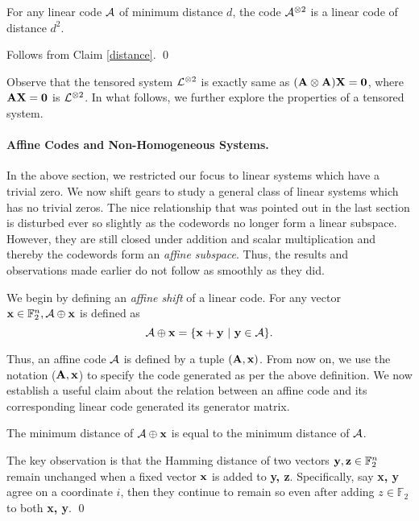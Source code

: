 {\begin{corollary}
  For any linear code ${\cal A}$ of minimum distance $d$, the code
  ${\cal A}^{\otimes 2}$ is a linear code of distance $d^2$.
\end{corollary}
 Follows from Claim \ref{distance}. \qed

Observe that the tensored system ${\cal L}^{\otimes 2}$ is exactly same as
$({\bf A} \otimes {\bf A}) {\bf X} = {\bf 0}$, where ${\bf AX = 0}$ is
${\cal L}^{\otimes 2}$.  In what follows, we further explore the properties
of a tensored system.

\paragraph{Affine Codes and Non-Homogeneous Systems.}

In the above section, we restricted our focus to linear systems which
have a trivial zero. We now shift gears to study a general class of
linear systems which has no trivial zeros. The nice relationship that
was pointed out in the last section is disturbed ever so slightly as
the codewords no longer form a linear subspace. However, they are
still closed under addition and scalar multiplication and thereby the
codewords form an {\em affine subspace}. Thus, the results and
observations made earlier do not follow as smoothly as they did.

\noindent We begin by defining an {\em affine shift} of a linear
code. For any vector ${\bf x} \in \mathbb{F}_2^{n}, {\cal A} \oplus {\bf x}$
is defined as
\[
        {\cal A} \oplus {\bf x} = \{{\bf x + y ~|~ y} \in {\cal A} \}.
\]

Thus, an affine code ${\cal A}$ is defined by a tuple $({\bf A, x})$. From
now on, we use the notation \A(${\bf A, x}$) to specify the code
generated as per the above definition. We now establish a useful claim
about the relation between an affine code and its corresponding linear
code generated its generator matrix.

\begin{claim} \label{ind}
The minimum distance of ${\cal A} \oplus {\bf x}$ is equal to the minimum distance of ${\cal A}$.
\end{claim}
 The key observation is that the Hamming
distance of two vectors ${\bf y, z} \in {\mathbb{F}}_{2}^{n}$ remain
unchanged when a fixed vector ${\bf x}$ is added to {\bf y,
  z}. Specifically, say {\bf x, y} agree on a coordinate $i$, then
they continue to remain so even after adding $z \in \mathbb{F}_2$ to
both {\bf x, y}. \qed


}
